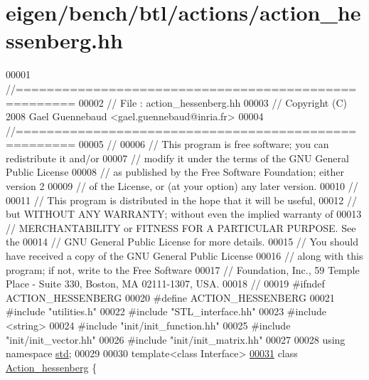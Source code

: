 \hypertarget{eigen_2bench_2btl_2actions_2action__hessenberg_8hh_source}{}\section{eigen/bench/btl/actions/action\+\_\+hessenberg.hh}
\label{eigen_2bench_2btl_2actions_2action__hessenberg_8hh_source}

\begin{DoxyCode}
00001 \textcolor{comment}{//=====================================================}
00002 \textcolor{comment}{// File   :  action\_hessenberg.hh}
00003 \textcolor{comment}{// Copyright (C) 2008 Gael Guennebaud <gael.guennebaud@inria.fr>}
00004 \textcolor{comment}{//=====================================================}
00005 \textcolor{comment}{//}
00006 \textcolor{comment}{// This program is free software; you can redistribute it and/or}
00007 \textcolor{comment}{// modify it under the terms of the GNU General Public License}
00008 \textcolor{comment}{// as published by the Free Software Foundation; either version 2}
00009 \textcolor{comment}{// of the License, or (at your option) any later version.}
00010 \textcolor{comment}{//}
00011 \textcolor{comment}{// This program is distributed in the hope that it will be useful,}
00012 \textcolor{comment}{// but WITHOUT ANY WARRANTY; without even the implied warranty of}
00013 \textcolor{comment}{// MERCHANTABILITY or FITNESS FOR A PARTICULAR PURPOSE.  See the}
00014 \textcolor{comment}{// GNU General Public License for more details.}
00015 \textcolor{comment}{// You should have received a copy of the GNU General Public License}
00016 \textcolor{comment}{// along with this program; if not, write to the Free Software}
00017 \textcolor{comment}{// Foundation, Inc., 59 Temple Place - Suite 330, Boston, MA  02111-1307, USA.}
00018 \textcolor{comment}{//}
00019 \textcolor{preprocessor}{#ifndef ACTION\_HESSENBERG}
00020 \textcolor{preprocessor}{#define ACTION\_HESSENBERG}
00021 \textcolor{preprocessor}{#include "utilities.h"}
00022 \textcolor{preprocessor}{#include "STL\_interface.hh"}
00023 \textcolor{preprocessor}{#include <string>}
00024 \textcolor{preprocessor}{#include "init/init\_function.hh"}
00025 \textcolor{preprocessor}{#include "init/init\_vector.hh"}
00026 \textcolor{preprocessor}{#include "init/init\_matrix.hh"}
00027 
00028 \textcolor{keyword}{using namespace }\hyperlink{namespacestd}{std};
00029 
00030 \textcolor{keyword}{template}<\textcolor{keyword}{class} Interface>
\hyperlink{class_action__hessenberg}{00031} \textcolor{keyword}{class }\hyperlink{class_action__hessenberg}{Action\_hessenberg} \{

\end{DoxyCode}
